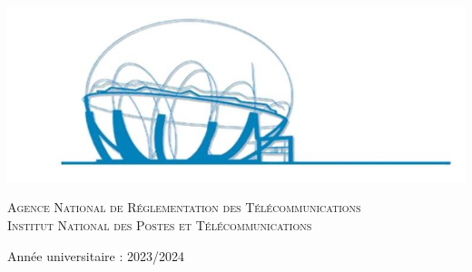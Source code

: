 \begin{center}
\includegraphics[scale=0.65]{Logos/ZLAFA.png}


\textsc{Agence National de Réglementation des Télécommunications}\\
\textsc{Institut National des Postes et Télécommunications}

{\large Année universitaire : 2023/2024}
   
\end{center}


